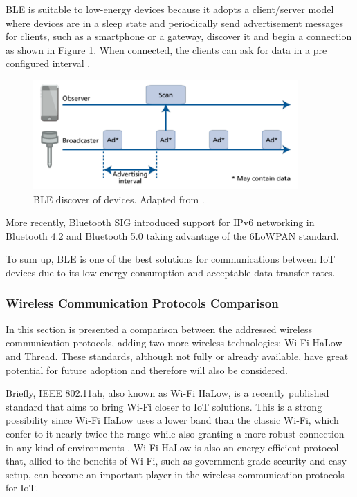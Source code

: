 BLE is suitable to low-energy devices because it adopts a client/server model where devices are in a sleep state and periodically send advertisement messages for clients, such as a smartphone or a gateway, discover it and begin a connection as shown in Figure \ref{fig:ble2}. When connected, the clients can ask for data in a pre configured interval \cite{Andersson2014}. 

\begin{figure}[H]
	\centering
	\includegraphics[width=0.9\textwidth]{figures/ble2.png}
	\caption{BLE discover of devices. Adapted from \cite{Andersson2014}.}
	\label{fig:ble2}
\end{figure}

More recently, Bluetooth SIG introduced support for IPv6 networking in Bluetooth 4.2 and Bluetooth 5.0 taking advantage of the 6LoWPAN standard.

To sum up, BLE is one of the best solutions for communications between IoT devices due to its low energy consumption and acceptable data transfer rates.


\subsubsection{Wireless Communication Protocols Comparison}

In this section is presented a comparison between the addressed wireless communication protocols, adding two more wireless technologies: Wi-Fi HaLow \cite{Wi-FiAlliance2017} and Thread. These standards, although not fully or already available, have great potential for future adoption and therefore will also be considered.


Briefly, IEEE 802.11ah, also known as Wi-Fi HaLow, is a recently published standard that aims to bring Wi-Fi closer to IoT solutions. This is a strong possibility since Wi-Fi HaLow uses a lower band than the classic Wi-Fi, which confer to it nearly twice the range while also granting a more robust connection in any kind of environments \cite{Wi-FiAlliance2017}. Wi-Fi HaLow is also an energy-efficient protocol that, allied to the benefits of Wi-Fi, such as government-grade security and easy setup, can become an important player in the wireless communication protocols for IoT.

